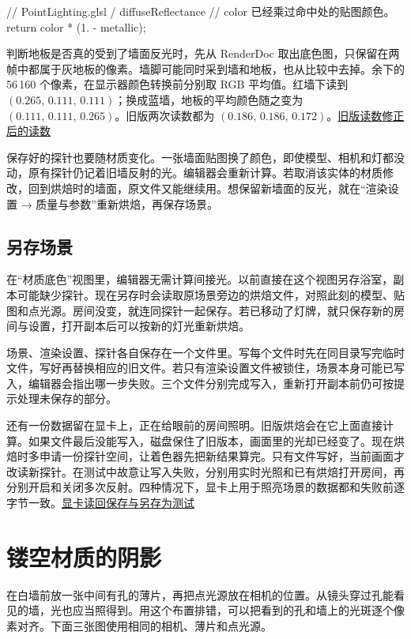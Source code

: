 \begin{Code}
// PointLighting.glsl / diffuseReflectance
// color 已经乘过命中处的贴图颜色。
return color * (1. - metallic);
\end{Code}

判断地板是否真的受到了墙面反光时，先从 RenderDoc 取出底色图，只保留在两帧中都属于灰地板的像素。墙脚可能同时采到墙和地板，也从比较中去掉。余下的 56\,160 个像素，在显示器颜色转换前分别取 RGB 平均值。红墙下读到 $(0.265,\,0.111,\,0.111)$；换成蓝墙，地板的平均颜色随之变为 $(0.111,\,0.111,\,0.265)$。旧版两次读数都为 $(0.186,\,0.186,\,0.172)$。\href{run:../profiling/probe-materials/before.json}{旧版读数}\quad\href{run:../profiling/probe-materials/after.json}{修正后的读数}

保存好的探针也要随材质变化。一张墙面贴图换了颜色，即使模型、相机和灯都没动，原有探针仍记着旧墙反射的光。编辑器会重新计算。若取消该实体的材质修改，回到烘焙时的墙面，原文件又能继续用。想保留新墙面的反光，就在“渲染设置 → 质量与参数”重新烘焙，再保存场景。

\subsection{另存场景}
在“材质底色”视图里，编辑器无需计算间接光。以前直接在这个视图另存浴室，副本可能缺少探针。现在另存时会读取原场景旁边的烘焙文件，对照此刻的模型、贴图和点光源。房间没变，就连同探针一起保存。若已移动了灯牌，就只保存新的房间与设置，打开副本后可以按新的灯光重新烘焙。

场景、渲染设置、探针各自保存在一个文件里。写每个文件时先在同目录写完临时文件，写好再替换相应的旧文件。若只有渲染设置文件被锁住，场景本身可能已写入，编辑器会指出哪一步失败。三个文件分别完成写入，重新打开副本前仍可按提示处理未保存的部分。

还有一份数据留在显卡上，正在给眼前的房间照明。旧版烘焙会在它上面直接计算。如果文件最后没能写入，磁盘保住了旧版本，画面里的光却已经变了。现在烘焙时多申请一份探针空间，让着色器先把新结果算完。只有文件写好，当前画面才改读新探针。在测试中故意让写入失败，分别用实时光照和已有烘焙打开房间，再分别开启和关闭多次反射。四种情况下，显卡上用于照亮场景的数据都和失败前逐字节一致。\href{run:../profiling/probe-materials/bake-failure-after.json}{显卡读回}\quad\href{run:../profiling/probe-materials/save-as-after.json}{保存与另存为测试}

\clearpage
\section{镂空材质的阴影}
在白墙前放一张中间有孔的薄片，再把点光源放在相机的位置。从镜头穿过孔能看见的墙，光也应当照得到。用这个布置排错，可以把看到的孔和墙上的光斑逐个像素对齐。下面三张图使用相同的相机、薄片和点光源。

